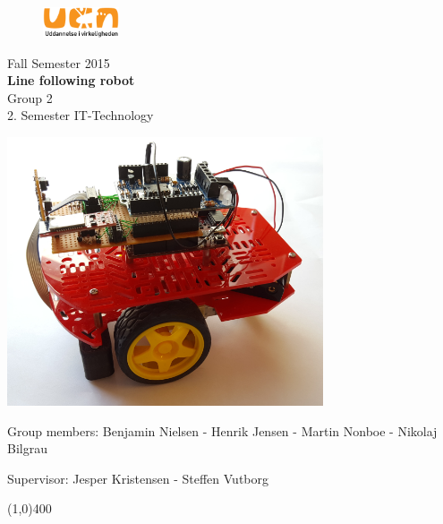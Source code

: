 \clearpage
\thispagestyle{empty}

\begin{figure}[H]
	\raggedleft
		\includegraphics[width=0.2\textwidth]{figures/logo-ucn.png}
\end{figure}
\vspace*{\fill} 
\begin{center}
\begin{Huge}
Fall Semester 2015\\
\vspace{5 mm}
\textbf{Line following robot}\\
\vspace{3 mm}
Group 2\\
\vspace{3 mm}
2. Semester IT-Technology
\end{Huge}
\includegraphics[width=0.7\textwidth]{figures/Forsidebil.PNG}
\end{center}
\vspace*{\fill}
\begin{center}
Group members:
 Benjamin Nielsen - Henrik Jensen - Martin Nonboe - Nikolaj Bilgrau
\end{center}
\begin{center}
Supervisor: Jesper Kristensen - Steffen Vutborg
\end{center}
\begin{center}
\line(1,0){400}
\end{center}